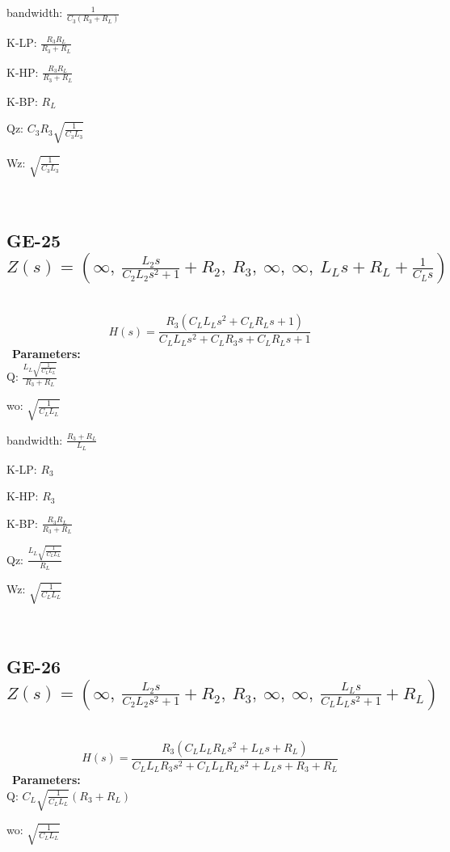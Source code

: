 \documentclass{article}
\begin{document}
bandwidth: $\frac{1}{C_{3} \left(R_{3} + R_{L}\right)}$\ 

K-LP: $\frac{R_{3} R_{L}}{R_{3} + R_{L}}$\ 

K-HP: $\frac{R_{3} R_{L}}{R_{3} + R_{L}}$\ 

K-BP: $R_{L}$\ 

Qz: $C_{3} R_{3} \sqrt{\frac{1}{C_{3} L_{3}}}$\ 

Wz: $\sqrt{\frac{1}{C_{3} L_{3}}}$\ 

\ 

\subsection{GE-25 $Z(s) = \left( \infty, \  \frac{L_{2} s}{C_{2} L_{2} s^{2} + 1} + R_{2}, \  R_{3}, \  \infty, \  \infty, \  L_{L} s + R_{L} + \frac{1}{C_{L} s}\right)$ } \ 
\textbf{\[H(s) = \frac{R_{3} \left(C_{L} L_{L} s^{2} + C_{L} R_{L} s + 1\right)}{C_{L} L_{L} s^{2} + C_{L} R_{3} s + C_{L} R_{L} s + 1}\] } \ 
\textbf{Parameters:}\\ 

Q: $\frac{L_{L} \sqrt{\frac{1}{C_{L} L_{L}}}}{R_{3} + R_{L}}$\ 

wo: $\sqrt{\frac{1}{C_{L} L_{L}}}$\ 

bandwidth: $\frac{R_{3} + R_{L}}{L_{L}}$\ 

K-LP: $R_{3}$\ 

K-HP: $R_{3}$\ 

K-BP: $\frac{R_{3} R_{L}}{R_{3} + R_{L}}$\ 

Qz: $\frac{L_{L} \sqrt{\frac{1}{C_{L} L_{L}}}}{R_{L}}$\ 

Wz: $\sqrt{\frac{1}{C_{L} L_{L}}}$\ 

\ 

\subsection{GE-26 $Z(s) = \left( \infty, \  \frac{L_{2} s}{C_{2} L_{2} s^{2} + 1} + R_{2}, \  R_{3}, \  \infty, \  \infty, \  \frac{L_{L} s}{C_{L} L_{L} s^{2} + 1} + R_{L}\right)$ } \ 
\textbf{\[H(s) = \frac{R_{3} \left(C_{L} L_{L} R_{L} s^{2} + L_{L} s + R_{L}\right)}{C_{L} L_{L} R_{3} s^{2} + C_{L} L_{L} R_{L} s^{2} + L_{L} s + R_{3} + R_{L}}\] } \ 
\textbf{Parameters:}\\ 

Q: $C_{L} \sqrt{\frac{1}{C_{L} L_{L}}} \left(R_{3} + R_{L}\right)$\ 

wo: $\sqrt{\frac{1}{C_{L} L_{L}}}$\ 
\end{document}
